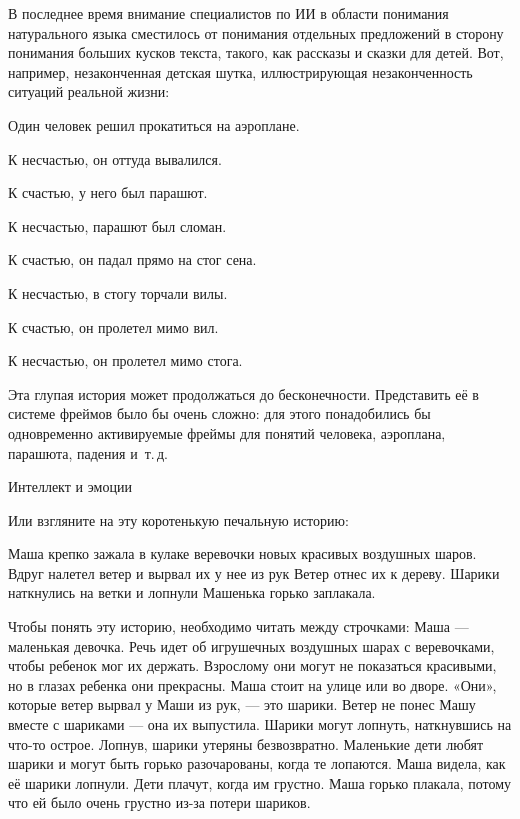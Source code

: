 \documentclass[../main.tex]{subfiles}
\begin{document}
В последнее время внимание специалистов по ИИ в области понимания натурального языка сместилось от понимания отдельных предложений в сторону понимания больших кусков текста, такого, как рассказы и сказки для детей. Вот, например, незаконченная детская шутка, иллюстрирующая незаконченность ситуаций реальной жизни:

Один человек решил прокатиться на аэроплане.

К несчастью, он оттуда вывалился.

К счастью, у него был парашют.

К несчастью, парашют был сломан.

К счастью, он падал прямо на стог сена.

К несчастью, в стогу торчали вилы.

К счастью, он пролетел мимо вил.

К несчастью, он пролетел мимо стога.

Эта глупая история может продолжаться до бесконечности. Представить её в системе фреймов было бы очень сложно: для этого понадобились бы одновременно активируемые фреймы для понятий человека, аэроплана, парашюта, падения и~т.\,д.

Интеллект и эмоции

Или взгляните на эту коротенькую печальную историю:

Маша крепко зажала в кулаке веревочки новых красивых воздушных шаров. Вдруг налетел ветер и вырвал их у нее из рук Ветер отнес их к дереву. Шарики наткнулись на ветки и лопнули Машенька горько заплакала.

Чтобы понять эту историю, необходимо читать между строчками: Маша --- маленькая девочка. Речь идет об игрушечных воздушных шарах с веревочками, чтобы ребенок мог их держать. Взрослому они могут не показаться красивыми, но в глазах ребенка они прекрасны. Маша стоит на улице или во дворе. «Они», которые ветер вырвал у Маши из рук, --- это шарики. Ветер не понес Машу вместе с шариками --- она их выпустила. Шарики могут лопнуть, наткнувшись на что-то острое. Лопнув, шарики утеряны безвозвратно. Маленькие дети любят шарики и могут быть горько разочарованы, когда те лопаются. Маша видела, как её шарики лопнули. Дети плачут, когда им грустно. Маша горько плакала, потому что ей было очень грустно из-за потери шариков.
\end{document}
